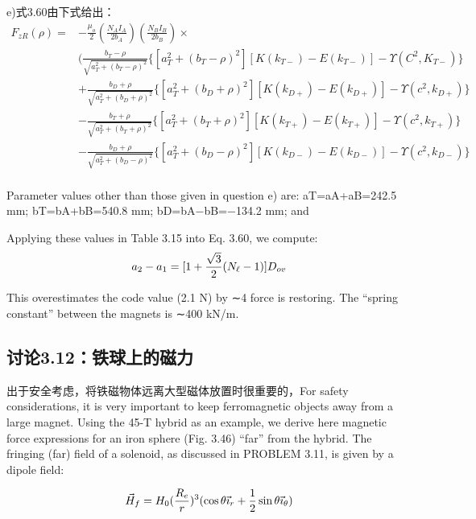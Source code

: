 
e)式3.60由下式给出：
\begin{equation}
\begin{split}
F_{zR}(\rho)=&-\frac{\mu_{o}}{2}(\frac{N_{A}I_{A}}{2b_{A}})(\frac{N_{B}I_{B}}{2b_{B}})\times\\
&(\frac{b_{T}-\rho}{\sqrt{a_{T}^{2}+(b_{T}-\rho)^{2}}}\{[a_{T}^{2}+(b_{T}-\rho)^{2}][K(k_{T-})-E(k_{T-})]-\Upsilon(C^{2},K_{T-})\}\\
&+\frac{b_{D}+\rho}{\sqrt{a_{T}^{2}+(b_{D}+\rho)^{2}}}\{[a_{T}^{2}+(b_{D}+\rho)^{2}][K(k_{D+})-E(k_{D+})]-\Upsilon(c^{2},k_{D+})\}\\
&-\frac{b_{T}+\rho}{\sqrt{a_{T}^{2}+(b_{T}+\rho)^{2}}}\{[a_{T}^{2}+(b_{T}+\rho)^{2}][K(k_{T+})-E(k_{T+})]-\Upsilon(c^{2},k_{T+})\}\\
&-\frac{b_{D}+\rho}{\sqrt{a_{T}^{2}+(b_{D}-\rho)^{2}}}\{[a_{T}^{2}+(b_{D}-\rho)^{2}][K(k_{D-})-E(k_{D-})]-\Upsilon(c^{2},k_{D-})\}\\%
\end{split}
\end{equation}

Parameter values other than those given in question e) are: aT=aA+aB=242.5 mm;
bT=bA+bB=540.8 mm; bD=bA−bB=−134.2 mm; and


Applying these values in Table 3.15 into Eq. 3.60, we compute:
$$
a_{2}-a_{1}=[1+\frac{\sqrt{3}}{2}(N_{\ell}-1)]D_{ov}\\%
$$

This overestimates the code value (2.1 N) by ∼4%
force is restoring. The “spring constant” between the magnets is ∼400 kN/m.
\newpage


\subsection{讨论3.12：铁球上的磁力}
出于安全考虑，将铁磁物体远离大型磁体放置时很重要的，For safety considerations, it is very important to keep ferromagnetic objects away
from a large magnet. Using the 45-T hybrid as an example, we derive here magnetic
force expressions for an iron sphere (Fig. 3.46) “far” from the hybrid. The fringing
(far) field of a solenoid, as discussed in PROBLEM 3.11, is given by a dipole field:

\begin{equation}
\vec{H}_{f}=H_{0}(\frac{R_{e}}{r})^{3}(\cos\theta\vec{\imath}_{r}+\frac{1}{2}\sin\theta\vec{\imath}_{\theta})\\%
\end{equation}

